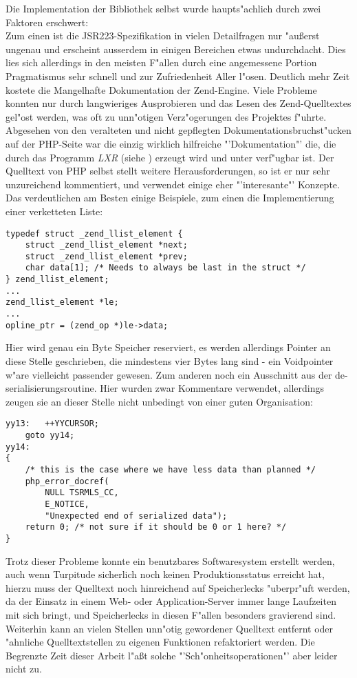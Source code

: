 Die Implementation der Bibliothek selbst wurde haupts"achlich durch zwei Faktoren erschwert:\\
Zum einen ist die JSR223-Spezifikation in vielen Detailfragen nur "au\ss erst ungenau und erscheint ausserdem
in einigen Bereichen etwas undurchdacht. Dies lies sich allerdings in den meisten F"allen durch eine
angemessene Portion Pragmatismus sehr schnell und zur Zufriedenheit Aller l"osen. Deutlich mehr Zeit
kostete die Mangelhafte Dokumentation der Zend-Engine. Viele Probleme konnten nur durch langwieriges
Ausprobieren und das Lesen des Zend-Quelltextes gel"ost werden, was oft zu unn"otigen Verz"ogerungen 
des Projektes f"uhrte. Abgesehen von den veralteten und nicht gepflegten Dokumentationsbruchst"ucken
auf der PHP-Seite \cite{PHPHP} war die einzig wirklich hilfreiche "'Dokumentation"' die, die durch das Programm
\emph{LXR} (siehe \cite{LXRHP}) erzeugt wird und unter \cite{PHPLXR} verf"ugbar ist. Der Quelltext
von PHP selbst stellt weitere Herausforderungen, so ist er nur sehr unzureichend kommentiert, und verwendet
einige eher "'interesante"' Konzepte. Das verdeutlichen am Besten einige Beispiele, zum einen die 
Implementierung einer verketteten Liste:
\begin{lstlisting}[caption=Verkettete Liste im Zend-Code]
typedef struct _zend_llist_element {
    struct _zend_llist_element *next;
    struct _zend_llist_element *prev;
    char data[1]; /* Needs to always be last in the struct */
} zend_llist_element;
...
zend_llist_element *le;
...
opline_ptr = (zend_op *)le->data;
\end{lstlisting}
Hier wird genau ein Byte Speicher reserviert, es werden allerdings Pointer an diese Stelle geschrieben,
die mindestens vier Bytes lang sind - ein Voidpointer w"are vielleicht passender gewesen.
Zum anderen noch ein Ausschnitt aus der de-serialisierungsroutine. Hier wurden zwar Kommentare
verwendet, allerdings zeugen sie an dieser Stelle nicht unbedingt von einer guten Organisation:
\begin{lstlisting}[caption=lustiges Beispiel f"ur Zend-Code]
yy13:   ++YYCURSOR;
    goto yy14;
yy14:
{
    /* this is the case where we have less data than planned */
    php_error_docref(
        NULL TSRMLS_CC, 
        E_NOTICE, 
        "Unexpected end of serialized data");
    return 0; /* not sure if it should be 0 or 1 here? */
}
\end{lstlisting}

Trotz dieser Probleme konnte ein benutzbares Softwaresystem erstellt werden, auch wenn Turpitude sicherlich
noch keinen Produktionsstatus erreicht hat, hierzu muss der Quelltext noch hinreichend auf Speicherlecks
"uberpr"uft werden, da der Einsatz in einem Web- oder Application-Server immer lange Laufzeiten mit sich bringt,
und Speicherlecks in diesen F"allen besonders gravierend sind. Weiterhin kann an vielen Stellen unn"otig gewordener
Quelltext entfernt oder "ahnliche Quelltextstellen zu eigenen Funktionen refaktoriert werden. Die Begrenzte Zeit
dieser Arbeit l"a\ss t solche "'Sch"onheitsoperationen"' aber leider nicht zu.

